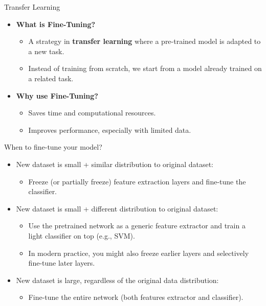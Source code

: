 \begin{frame}[allowframebreaks]{Transfer Learning}
\begin{itemize}
    \item \textbf{What is Fine-Tuning?}  
    \begin{itemize}
        \item A strategy in \textbf{transfer learning} where a pre-trained model is adapted to a new task.
        \item Instead of training from scratch, we start from a model already trained on a related task.
    \end{itemize}
    \item \textbf{Why use Fine-Tuning?}  
    \begin{itemize}
        \item Saves time and computational resources.
        \item Improves performance, especially with limited data.
    \end{itemize}
\end{itemize}
\end{frame}

\begin{frame}[allowframebreaks]{When to fine-tune your model?}
    \begin{itemize}
        \item New dataset is small + similar distribution to original dataset:
        \begin{itemize}
            \item Freeze (or partially freeze) feature extraction layers and fine-tune the classifier.
        \end{itemize}
        \item New dataset is small + different distribution to original dataset:
        \begin{itemize}
            \item Use the pretrained network as a generic feature extractor and train a light classifier on top (e.g., SVM).
            \item In modern practice, you might also freeze earlier layers and selectively fine-tune later layers.
        \end{itemize}
        \item New dataset is large, regardless of the original data distribution:
        \begin{itemize}
            \item Fine-tune the entire network (both features extractor and classifier).
        \end{itemize}
    \end{itemize}
\end{frame}


